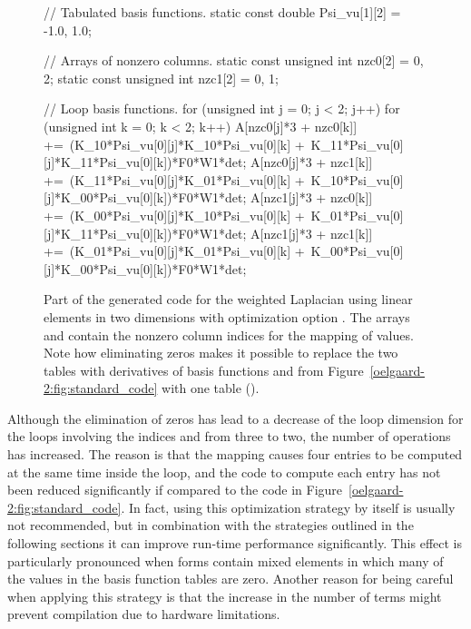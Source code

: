 \begin{figure}
\begin{c++}
// Tabulated basis functions.
static const double Psi_vu[1][2] = {{-1.0, 1.0}};

// Arrays of nonzero columns.
static const unsigned int nzc0[2] = {0, 2};
static const unsigned int nzc1[2] = {0, 1};

// Loop basis functions.
for (unsigned int j = 0; j < 2; j++)
{
 for (unsigned int k = 0; k < 2; k++)
 {
  A[nzc0[j]*3 + nzc0[k]] +=\
   (K_10*Psi_vu[0][j]*K_10*Psi_vu[0][k] +\
    K_11*Psi_vu[0][j]*K_11*Psi_vu[0][k])*F0*W1*det;
  A[nzc0[j]*3 + nzc1[k]] +=\
   (K_11*Psi_vu[0][j]*K_01*Psi_vu[0][k] +\
    K_10*Psi_vu[0][j]*K_00*Psi_vu[0][k])*F0*W1*det;
  A[nzc1[j]*3 + nzc0[k]] +=\
   (K_00*Psi_vu[0][j]*K_10*Psi_vu[0][k] +\
    K_01*Psi_vu[0][j]*K_11*Psi_vu[0][k])*F0*W1*det;
  A[nzc1[j]*3 + nzc1[k]] +=\
   (K_01*Psi_vu[0][j]*K_01*Psi_vu[0][k] +\
    K_00*Psi_vu[0][j]*K_00*Psi_vu[0][k])*F0*W1*det;
 }
}
\end{c++}
\caption{Part of the generated code for the weighted Laplacian using
  linear elements in two dimensions with optimization option \emp{-f
    eliminate\_zeros}.  The arrays  and  contain the
  nonzero column indices for the mapping of values.  Note how
  eliminating zeros makes it possible to replace the two tables with
  derivatives of basis functions  and
   from Figure~\ref{oelgaard-2:fig:standard_code} with
  one table ().}
\label{oelgaard-2:fig:O_zeros_code}
\end{figure}

Although the elimination of zeros has lead to a decrease of the loop
dimension for the loops involving the indices \emp{j} and \emp{k} from
three to two, the number of operations has increased.  The reason is
that the mapping causes four entries to be computed at the same time
inside the loop, and the code to compute each entry has not been
reduced significantly if compared to the code in
Figure~\ref{oelgaard-2:fig:standard_code}.  In fact, using this
optimization strategy by itself is usually not recommended, but in
combination with the strategies outlined in the following sections it
can improve run-time performance significantly.  This effect is
particularly pronounced when forms contain mixed elements in which
many of the values in the basis function tables are zero.  Another
reason for being careful when applying this strategy is that the
increase in the number of terms might prevent \ffc{} compilation due
to hardware limitations.

